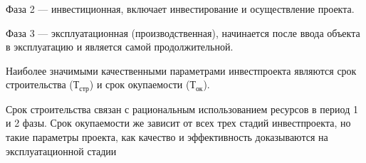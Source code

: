 Фаза 2 --- инвестиционная, включает инвестирование и осуществление проекта.

Фаза 3 --- эксплуатационная (производственная), начинается после ввода объекта в эксплуатацию и является самой продолжительной.

Наиболее значимыми качественными параметрами инвестпроекта являются срок строительства ($\text{Т}_{\text{стр}}$) и срок окупаемости ($\text{Т}_{\text{ок}}$).

Срок строительства связан с рациональным использованием ресурсов в период 1 и 2 фазы. Срок окупаемости же зависит от всех трех стадий инвестпроекта, но такие параметры проекта, как качество и эффективность доказываются на эксплуатационной стадии \cite[с. 162--166]{sergeev}





































